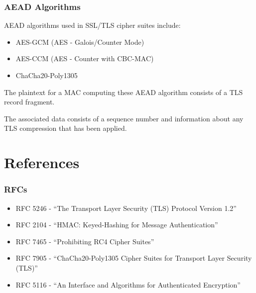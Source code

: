 \documentclass[aspectratio=169]{beamer}
\begin{document}
\begin{frame}[triangle=siiblue]
	\frametitle{AEAD Algorithms}
	AEAD algorithms used in SSL/TLS cipher suites include:
	\begin{itemize}
		\item AES-GCM (AES - Galois/Counter Mode)
		\item AES-CCM (AES - Counter with CBC-MAC)
		\item ChaCha20-Poly1305
	\end{itemize}

	\vfill
	
	The plaintext for a MAC computing these AEAD algorithm consists of a TLS record fragment.
	
	\vfill
	
	The associated data consists of a sequence number and information about any TLS compression that has been applied.
\end{frame}

\section{References}
\begin{frame}[Triangle=siiorange]
	\tocpage
\end{frame}

\begin{frame}[triangle=siiblue]
	\frametitle{RFCs}
	\begin{itemize}
		\item RFC 5246 - ``The Transport Layer Security (TLS) Protocol Version 1.2''
		
		\vfill
				
		\item RFC 2104 - ``HMAC: Keyed-Hashing for Message Authentication''

		\vfill
				
		\item RFC 7465 - ``Prohibiting RC4 Cipher Suites''

		\vfill
				
		\item RFC 7905 - ``ChaCha20-Poly1305 Cipher Suites for Transport Layer Security (TLS)''

		\vfill
				
		\item RFC 5116 - ``An Interface and Algorithms for Authenticated Encryption''
	\end{itemize}
\end{frame}
\end{document}
